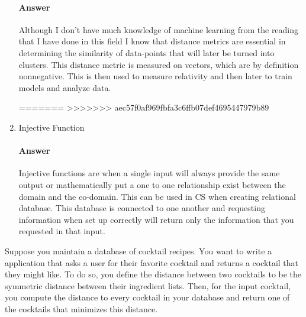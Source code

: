 \documentclass{article}
\begin{document}
\begin{enumerate}
        \paragraph{Answer}

        Although I don't have much knowledge of machine learning from the reading that I have done
        in this field I know that distance metrics are essential in determining the similarity of data-points
        that will later be turned into clusters. This distance metric is measured on vectors, which are by definition
        nonnegative. This is then used to measure relativity and then later to train models and analyze data.

=======
>>>>>>> aec57f0af969fbfa3c6ffb07def4695447979b89
    \item Injective Function

        \paragraph{Answer}

        Injective functions are when a single input will always provide the same output or mathematically
        put a one to one relationship exist between the domain and the co-domain. This can be used in
        CS when creating relational database. This database is connected to one another and requesting information
        when set up correctly will return only the information that you requested in that input.



\end{enumerate}


\collab{\todo{}} 

Suppose you maintain a database of cocktail recipes.  You want to write a
application that asks a user for their favorite cocktail and returns a cocktail
that they might like.  To do so, you define the distance between two cocktails
to be the symmetric distance between their ingredient lists.  Then, for the
input cocktail, you compute the distance to every cocktail in your database and
return one of the cocktails that minimizes this distance.
\end{document}
